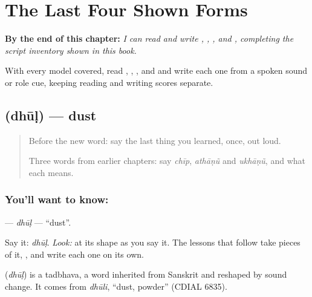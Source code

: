 
\chapter{The Last Four Shown Forms}
\label{ch:gu-final-script-closure-b}

\begin{chapteropening}
\textbf{By the end of this chapter:} \emph{I can read and write , , , and , completing the script inventory shown in this book.}

With every model covered, read , , , and  and write each one from a spoken sound or role cue, keeping reading and writing scores separate.
\end{chapteropening}

\section[\texorpdfstring{\gu{ધૂળ} (dhūḷ)}{ધૂળ (dhūḷ)}]{ (dhūḷ) — dust}

\label{lesson:GU-C07-dhool}



\begin{quote}
Before the new word: say the last thing you learned, once, out loud.

Three words from earlier chapters: say \emph{chīp}, \emph{athāṇũ} and \emph{ukhāṇũ}, and what each means.
\end{quote}

\subsection*{You'll want to know: }
\textbf{} — \emph{dhūḷ} — \textquotedblleft{}dust\textquotedblright{}.

Say it: \emph{dhūḷ}. \emph{Look:} at its shape as you say it. The lessons that follow take pieces of it, \textbf{}, and write each one on its own.

\begin{cousinweb}
\textbf{} (\emph{dhūḷ}) is a tadbhava, a word inherited from Sanskrit and reshaped by sound change. It comes from \emph{dhūli}, \textquotedblleft{}dust, powder\textquotedblright{} (CDIAL 6835).
\end{cousinweb}

